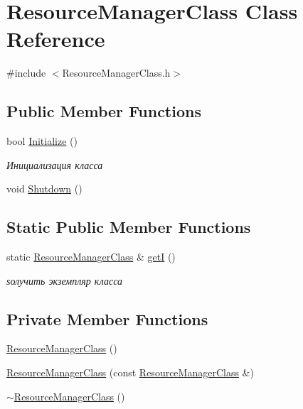 \hypertarget{class_resource_manager_class}{}\section{Resource\+Manager\+Class Class Reference}
\label{class_resource_manager_class}


{\ttfamily \#include $<$Resource\+Manager\+Class.\+h$>$}

\subsection*{Public Member Functions}
\begin{DoxyCompactItemize}
\item 
bool \hyperlink{group___resource_managment_ga333d99b892f59b1871f24c534760f5e8}{Initialize} ()
\begin{DoxyCompactList}\small\item\em Инициализация класса \end{DoxyCompactList}\item 
void \hyperlink{group___resource_managment_ga0b1a522696aa57d27d2c087c4da08200}{Shutdown} ()
\end{DoxyCompactItemize}
\subsection*{Static Public Member Functions}
\begin{DoxyCompactItemize}
\item 
static \hyperlink{class_resource_manager_class}{Resource\+Manager\+Class} \& \hyperlink{group___resource_managment_gad93d52351dac048f1cd5201e6859ff53}{getI} ()
\begin{DoxyCompactList}\small\item\em ѕолучить экземпляр класса \end{DoxyCompactList}\end{DoxyCompactItemize}
\subsection*{Private Member Functions}
\begin{DoxyCompactItemize}
\item 
\hyperlink{group___resource_managment_gae450c8971a22643cd706a16519e5a33a}{Resource\+Manager\+Class} ()
\item 
\hyperlink{group___resource_managment_gaff7b246270fac0d5a7ba2c518323b130}{Resource\+Manager\+Class} (const \hyperlink{class_resource_manager_class}{Resource\+Manager\+Class} \&)
\item 
\hyperlink{group___resource_managment_gad5e62785d102310401ea8468f962edb7}{$\sim$\+Resource\+Manager\+Class} ()
\end{DoxyCompactItemize}
